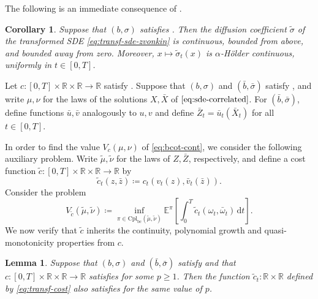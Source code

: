 \documentclass[onseside, final]{amsart}
\newtheorem{lemma}[theorem]{Lemma}
\newtheorem{corollary}[theorem]{Corollary}
\theoremstyle{definition}
\newcommand{\R}{\mathbb R}
\newcommand{\E}{\mathbb E}
\newcommand{\D}{\,\mathrm{d}}
\newcommand{\cpl}{\mathrm{Cpl}}
\newcommand{\cplba}{\cpl_{\mathrm{bc}}}
\numberwithin{equation}{section}
\begin{document}
	The following is an immediate consequence of .
		
	\begin{corollary}\label{cor:lipschitz-coeffs}
		Suppose that $(b, \sigma)$ satisfies . Then the diffusion coefficient $\tilde \sigma$ of the transformed SDE \eqref{eq:transf-sde-zvonkin} is continuous, bounded from above, and bounded away from zero. Moreover, $x \mapsto \tilde \sigma_t(x)$ is $\alpha$-H\"older continuous, uniformly in $t \in [0, T]$.
	\end{corollary}
	
	Let $c \colon [0, T] \times \R \times \R \to \R$ satisfy . Suppose that $(b, \sigma)$ and $(\bar b, \bar \sigma)$ satisfy , and write $\mu, \nu$ for the laws of the solutions $X, \bar X$ of $\eqref{eq:sde-correlated}$. For $(\bar b, \bar \sigma)$, define functions $\bar u, \bar v$ analogously to $u, v$ and define $\bar Z_t = \bar u_t(\bar X_t)$ for all $t \in [0, T]$.

	In order to find the value $V_c(\mu, \nu)$ of \eqref{eq:bcot-cont}, we consider the following auxiliary problem. Write $\tilde \mu, \tilde \nu$ for the laws of $Z, \bar Z$, respectively, and define a cost function $\tilde c\colon [0, T] \times \R \times \R \to \R$ by 
	\begin{equation}\label{eq:transf-cost}
		\tilde c_t(z, \bar z) \coloneqq c_t(v_t(z), \bar v_t(\bar z)).
	\end{equation}
	Consider the problem
	\begin{equation}\label{eq:transformed-valued-z}
		V_{\tilde c}(\tilde \mu, \tilde \nu) \coloneqq \inf_{\pi \in \cplba(\tilde \mu, \tilde \nu)}\E^\pi\!\left[\int_0^T\tilde c_t(\omega_t, \bar \omega_t) \D t\right]\!.
	\end{equation}
	We now verify that $\tilde c$ inherits the continuity, polynomial growth and quasi-monotonicity properties from $c$.
		
	\begin{lemma}\label{lem:transformed-cost}
		Suppose that $(b, \sigma)$ and $(\bar b, \bar \sigma)$ satisfy  and that $c \colon [0, T] \times \R \times \R \to \R$ satisfies  for some $p \geq 1$.
		Then the function $\tilde c_t \colon \R \times \R$ defined by \eqref{eq:transf-cost} also satisfies  for the same value of $p$.
	\end{lemma}
	
\end{document}
